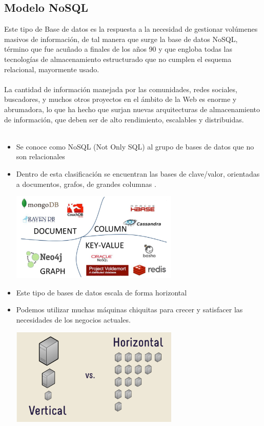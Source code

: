 \documentclass[%
 reprint,
 amsmath,amssymb,
 aps,
]{revtex4-1}
\begin{document}
\subsection{Modelo NoSQL}
Este tipo de Base de datos es la respuesta a la necesidad de gestionar volúmenes masivos de información, de tal manera que surge la base de datos NoSQL, término que fue acuñado a finales de los años 90 y que engloba todas las tecnologías de almacenamiento estructurado que no cumplen el esquema relacional, mayormente usado.\\\\
La cantidad de información manejada por las comunidades, redes sociales, buscadores, y muchos otros proyectos en el ámbito de la Web es enorme y abrumadora, lo que ha hecho que surjan nuevas arquitecturas de almacenamiento de información, que deben ser de alto rendimiento, escalables y distribuidas.\\\\
	           \begin{itemize}
		\item Se conoce como NoSQL (Not Only SQL) al grupo de bases de datos que no son relacionales
                     \item Dentro de esta clasificación se encuentran las bases de clave/valor, orientadas a documentos, grafos, de grandes columnas .\cite{Nicolas}
                     \begin{center}
		\includegraphics[width=8cm]{./Imagenes/2}
		\end{center}	
		\item Este tipo de bases de datos escala de forma horizontal
		\item Podemos utilizar muchas máquinas chiquitas para crecer y satisfacer las necesidades de los negocios actuales.\cite{Nicolas}
                     \begin{center}
		\includegraphics[width=8cm]{./Imagenes/3}
		\end{center}	
	          \end{itemize}
\end{document}
